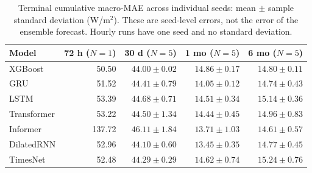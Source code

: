 \begin{table}[!htbp]
\centering
\small
\setlength{\tabcolsep}{5pt}
\caption{Terminal cumulative macro-MAE across individual seeds: mean $\pm$ sample standard deviation (W/m$^2$). These are seed-level errors, not the error of the ensemble forecast. Hourly runs have one seed and no standard deviation.}
\label{tab:baseline_seeds}
\begin{tabular}{@{}lrrrr@{}}
\toprule
Model & 72 h ($N=1$) & 30 d ($N=5$) & 1 mo ($N=5$) & 6 mo ($N=5$) \\
\midrule
XGBoost & 50.50 & $44.00\pm0.02$ & $14.86\pm0.17$ & $14.80\pm0.11$ \\
GRU & 51.52 & $44.41\pm0.79$ & $14.05\pm0.12$ & $14.74\pm0.43$ \\
LSTM & 53.39 & $44.68\pm0.71$ & $14.51\pm0.34$ & $15.14\pm0.36$ \\
Transformer & 53.22 & $44.50\pm1.34$ & $14.44\pm0.45$ & $14.96\pm0.83$ \\
Informer & 137.72 & $46.11\pm1.84$ & $13.71\pm1.03$ & $14.61\pm0.57$ \\
DilatedRNN & 52.96 & $44.10\pm0.60$ & $13.45\pm0.35$ & $14.77\pm0.45$ \\
TimesNet & 52.48 & $44.29\pm0.29$ & $14.62\pm0.74$ & $15.24\pm0.76$ \\
\bottomrule
\end{tabular}
\end{table}
